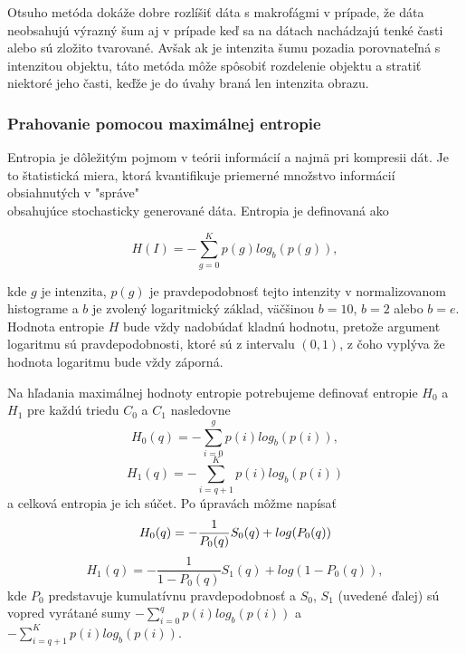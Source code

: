 \documentclass[a4paper,11pt,oneside]{article}%
\begin{document}
Otsuho metóda dokáže dobre rozlíšiť dáta s makrofágmi v prípade, že dáta neobsahujú výrazný šum aj v prípade keď sa na dátach nachádzajú tenké časti alebo sú zložito tvarované. Avšak ak je intenzita šumu pozadia porovnateľná s intenzitou objektu, táto metóda môže spôsobiť rozdelenie objektu a stratiť niektoré jeho časti, keďže je do úvahy braná len intenzita obrazu.

\subsubsection{Prahovanie pomocou maximálnej entropie} \label{kapurM}

Entropia je dôležitým pojmom v teórii informácií a najmä pri kompresii dát. Je to štatistická miera, ktorá kvantifikuje priemerné množstvo informácií obsiahnutých v  "správe" \\ obsahujúce stochasticky generované dáta. Entropia je definovaná ako

\begin{equation}
H(I)= -\sum_{g=0}^K p(g)log_b(p(g)),
\end{equation}


kde $g$ je intenzita, $p(g)$ je pravdepodobnosť tejto intenzity v normalizovanom histograme a $b$ je zvolený logaritmický základ, väčšinou $b=10$, $b=2$  alebo $b=e$. Hodnota entropie $H$ bude vždy nadobúdať kladnú hodnotu, pretože argument logaritmu sú pravdepodobnosti, ktoré sú z intervalu $(0,1)$, z čoho vyplýva že hodnota logaritmu bude vždy záporná. 

Na hľadania maximálnej hodnoty entropie potrebujeme definovať entropie $H_0$ a $H_1$ pre každú triedu $C_0$ a $C_1$ nasledovne
\begin{equation}
H_0(q)= -\sum_{i=0}^g p(i)log_b(p(i)),
\end{equation}
\begin{equation}
H_1(q)= -\sum_{i=q+1}^K p(i)log_b(p(i))
\end{equation}
a celková entropia je ich súčet.
Po úpravách môžme napísať \cite{ skripta1,kapur}
\begin{equation}
H_0(q) =  -\frac{1}{P_0(q)}S_0(q)+log(P_0(q)) \\
\end{equation}
\begin{equation}
H_1(q) =  -\frac{1}{1-P_0(q)}S_1(q)+log(1-P_0(q)),
\end{equation}
kde $P_0$ predstavuje kumulatívnu pravdepodobnosť a $S_0$, $S_1$ (uvedené ďalej) sú vopred vyrátané sumy  $  -\sum_{i=0}^q p(i)log_b(p(i)) $ a $  -\sum_{i=q+1}^K p(i)log_b(p(i)) $.
 
\end{document}
